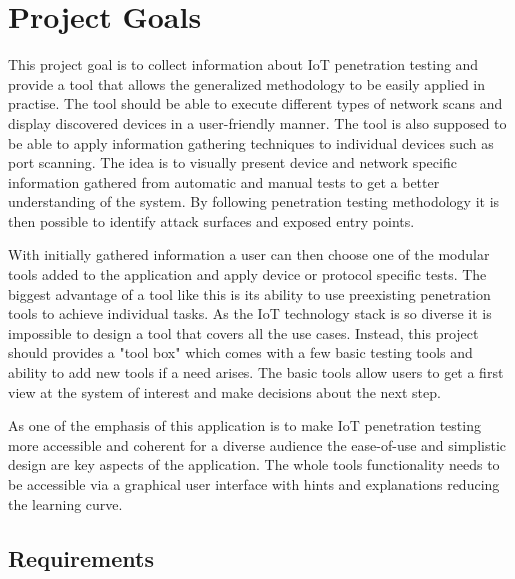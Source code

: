 
\section{Project Goals}
This project goal is to collect information about IoT penetration testing and provide a tool that allows the generalized methodology to be easily applied in practise. The tool should be able to execute different types of network scans and display discovered devices in a user-friendly manner. The tool is also supposed to be able to apply information gathering techniques to individual devices such as port scanning. The idea is to visually present device and network specific information gathered from automatic and manual tests to get a better understanding of the system. By following penetration testing methodology it is then possible to identify attack surfaces and exposed entry points.

With initially gathered information a user can then choose one of the modular tools added to the application and apply device or protocol specific tests. The biggest advantage of a tool like this is its ability to use preexisting penetration tools to achieve individual tasks. As the IoT technology stack is so diverse it is impossible to design a tool that covers all the use cases. Instead, this project should provides a "tool box" which comes with a few basic testing tools and ability to add new tools if a need arises. The basic tools allow users to get a first view at the system of interest and make decisions about the next step.

As one of the emphasis of this application is to make IoT penetration testing more accessible and coherent for a diverse audience the ease-of-use and simplistic design are key aspects of the application. The whole tools functionality needs to be accessible via a graphical user interface with hints and explanations reducing the learning curve.

\subsection{Requirements}
